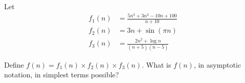 \Needspace{3in}
\begin{prob}

    Let
    \begin{align*}
        f_1(n) &= \frac{5n^3 + 3n^2 - 10n + 100}{n + 10}\\[2em]
        f_2(n) &= 3n + \sin(\pi n)\\[2em]
        f_3(n) &= \frac{2n^2 + \log n}{(n+5)(n-5)}
    \end{align*}

Define $f(n)  = f_1(n) \times f_2(n) \times f_3(n)$. What is $f(n)$, in asymptotic notation, in
simplest terms possible?


\end{prob}
